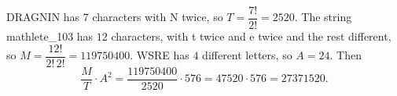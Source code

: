 DRAGNIN has $7$ characters with N twice, so $T=\dfrac{7!}{2!}=2520$. The string mathlete\_103 has $12$ characters, with t twice and e twice and the rest different, so $M=\dfrac{12!}{2!\,2!}=119750400$. WSRE has $4$ different letters, so $A=24$. Then
\[\dfrac MT\cdot A^2=\dfrac{119750400}{2520}\cdot576=47520\cdot576=\boxed{27371520}.\]
